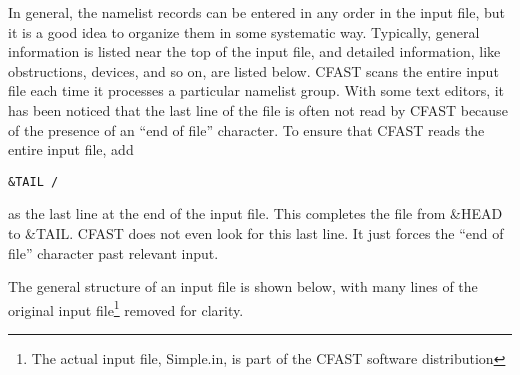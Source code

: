 In general, the namelist records can be entered in any order in the input file, but it is a good idea to organize them in some systematic way. Typically, general information is listed near the top of the input file, and detailed information, like obstructions, devices, and so on, are listed below. CFAST scans the entire input file each time it processes a particular namelist group. With some text editors, it has been noticed that the last line of the file is often not read by CFAST because of the presence of an ``end of file'' character. To ensure that CFAST reads the entire input file, add
\begin{lstlisting}
&TAIL /
\end{lstlisting}
as the last line at the end of the input file. This completes the file from {\ct \&HEAD} to {\ct \&TAIL}. CFAST does not even look for this last line. It just forces the ``end of file'' character past relevant input.

The general structure of an input file is shown below, with many lines of the original input file\footnote{The actual input file, Simple.in, is part of the CFAST software distribution} removed for clarity.

